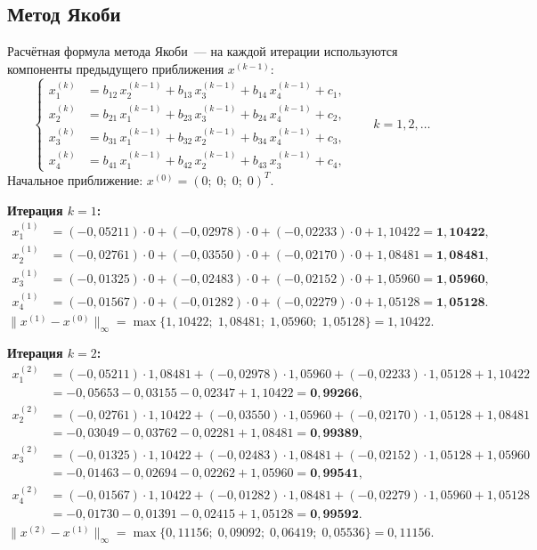 \documentclass[a4paper, final]{article}
\begin{document}
\newpage

\subsection{Метод Якоби}

Расчётная формула метода Якоби~--- на каждой итерации используются
компоненты предыдущего приближения $x^{(k-1)}$:
\[
\left\{
\begin{aligned}
x_1^{(k)} &= b_{12}\,x_2^{(k-1)} + b_{13}\,x_3^{(k-1)} + b_{14}\,x_4^{(k-1)} + c_1,\\
x_2^{(k)} &= b_{21}\,x_1^{(k-1)} + b_{23}\,x_3^{(k-1)} + b_{24}\,x_4^{(k-1)} + c_2,\\
x_3^{(k)} &= b_{31}\,x_1^{(k-1)} + b_{32}\,x_2^{(k-1)} + b_{34}\,x_4^{(k-1)} + c_3,\\
x_4^{(k)} &= b_{41}\,x_1^{(k-1)} + b_{42}\,x_2^{(k-1)} + b_{43}\,x_3^{(k-1)} + c_4,
\end{aligned}
\right.\qquad k=1,2,\ldots
\]
Начальное приближение: $x^{(0)} = (0;\;0;\;0;\;0)^T$.

\medskip\textbf{Итерация $k=1$:}
\begin{align*}
x_1^{(1)} &= (-0{,}05211)\cdot0 + (-0{,}02978)\cdot0 + (-0{,}02233)\cdot0 + 1{,}10422 = \mathbf{1{,}10422},\\
x_2^{(1)} &= (-0{,}02761)\cdot0 + (-0{,}03550)\cdot0 + (-0{,}02170)\cdot0 + 1{,}08481 = \mathbf{1{,}08481},\\
x_3^{(1)} &= (-0{,}01325)\cdot0 + (-0{,}02483)\cdot0 + (-0{,}02152)\cdot0 + 1{,}05960 = \mathbf{1{,}05960},\\
x_4^{(1)} &= (-0{,}01567)\cdot0 + (-0{,}01282)\cdot0 + (-0{,}02279)\cdot0 + 1{,}05128 = \mathbf{1{,}05128}.
\end{align*}
$\|x^{(1)}-x^{(0)}\|_\infty = \max\{1{,}10422;\;1{,}08481;\;1{,}05960;\;1{,}05128\} = 1{,}10422.$

\medskip\textbf{Итерация $k=2$:}
\begin{align*}
x_1^{(2)} &= (-0{,}05211)\cdot1{,}08481 + (-0{,}02978)\cdot1{,}05960 + (-0{,}02233)\cdot1{,}05128 + 1{,}10422\\
           &= -0{,}05653 - 0{,}03155 - 0{,}02347 + 1{,}10422 = \mathbf{0{,}99266},\\
x_2^{(2)} &= (-0{,}02761)\cdot1{,}10422 + (-0{,}03550)\cdot1{,}05960 + (-0{,}02170)\cdot1{,}05128 + 1{,}08481\\
           &= -0{,}03049 - 0{,}03762 - 0{,}02281 + 1{,}08481 = \mathbf{0{,}99389},\\
x_3^{(2)} &= (-0{,}01325)\cdot1{,}10422 + (-0{,}02483)\cdot1{,}08481 + (-0{,}02152)\cdot1{,}05128 + 1{,}05960\\
           &= -0{,}01463 - 0{,}02694 - 0{,}02262 + 1{,}05960 = \mathbf{0{,}99541},\\
x_4^{(2)} &= (-0{,}01567)\cdot1{,}10422 + (-0{,}01282)\cdot1{,}08481 + (-0{,}02279)\cdot1{,}05960 + 1{,}05128\\
           &= -0{,}01730 - 0{,}01391 - 0{,}02415 + 1{,}05128 = \mathbf{0{,}99592}.
\end{align*}
$\|x^{(2)}-x^{(1)}\|_\infty = \max\{0{,}11156;\;0{,}09092;\;0{,}06419;\;0{,}05536\} = 0{,}11156.$
\end{document}

